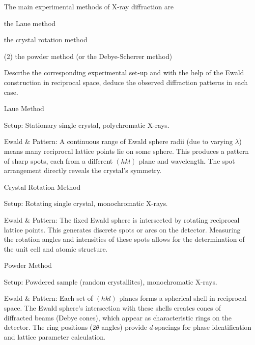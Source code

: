 \begin{problem}
  The main experimental methods of X-ray diffraction are
  \begin{enumext*}[label = (\alph*), columns = 2]
    \item the Laue method
    \item the crystal rotation method
    \item(2) the powder method (or the Debye-Scherrer method)
  \end{enumext*}
  Describe the corresponding experimental set-up and with the help of the Ewald
  construction in reciprocal space, deduce the observed diffraction patterns in
  each case.
\end{problem}
\begin{solution}\leavevmode
  \begin{enumext}
    \item Laue Method
    \begin{enumext}
      \item Setup: Stationary single crystal, polychromatic X-rays.
      \item Ewald \& Pattern: A continuous range of Ewald sphere radii (due to
      varying $\lambda$) means many reciprocal lattice points lie on some
      sphere. This produces a pattern of sharp spots, each from a different
      $(hkl)$ plane and wavelength. The spot arrangement directly reveals the
      crystal's symmetry.
    \end{enumext}
    \item Crystal Rotation Method
    \begin{enumext}
      \item Setup: Rotating single crystal, monochromatic X-rays.
      \item Ewald \& Pattern: The fixed Ewald sphere is intersected by rotating
      reciprocal lattice points. This generates discrete spots or arcs on the
      detector. Measuring the rotation angles and intensities of these spots
      allows for the determination of the unit cell and atomic structure.
    \end{enumext}
    \item Powder Method
    \begin{enumext}
      \item Setup: Powdered sample (random crystallites),
      mono\-chromatic X-rays.
      \item Ewald \& Pattern: Each set of $(hkl)$ planes forms a spherical shell
      in reciprocal space. The Ewald sphere's intersection with these shells
      creates cones of diffracted beams (Debye cones), which appear as
      characteristic rings on the detector. The ring positions
      ($2\theta$ angles) provide $d$-spacings for phase identification and
      lattice parameter calculation.
    \end{enumext}
  \end{enumext}
\end{solution}
